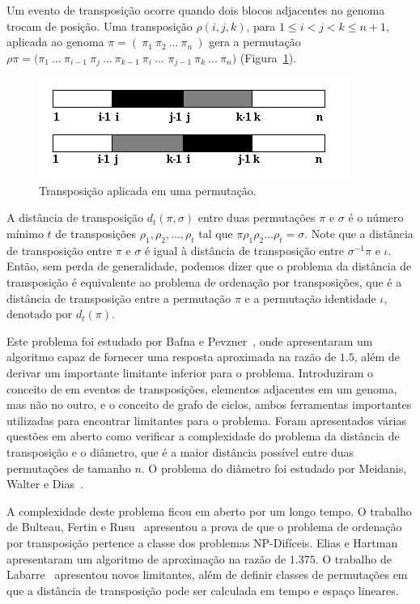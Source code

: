Um evento de transposição ocorre quando dois blocos adjacentes no
genoma trocam de posição. Uma transposição $\rho(i, j, k)$, para
$1 \leq i < j < k \leq n + 1$, aplicada ao genoma $\pi =
(~\pi_{1}~\pi_{2}~\ldots~\pi_{n}~)$ gera a permutação $\rho\pi =
(\pi_{1}~\ldots~\pi_{i-1}~\pi_{j}~\ldots~\pi_{k-1}~\pi_{i}~\ldots$
$\pi_{j-1}~\pi_{k}~\ldots~\pi_{n})$ (Figura~\ref{fig:transposition}).

\begin{figure}[h]
  \centering
  \includegraphics{images/transposition.png} 
  \caption{Transposição aplicada em uma permutação.}
  \label{fig:transposition}
\end{figure}

A distância de transposição $d_{t}(\pi, \sigma)$ entre duas
permutações $\pi$ e $\sigma$ é o número mínimo $t$ de transposições
$\rho_{1}, \rho_{2}, \ldots, \rho_{t}$ tal que
$\pi \rho_{1} \rho_{2} \ldots \rho_{t} = \sigma$. Note que a distância
de transposição entre $\pi$ e $\sigma$ é igual à distância de transposição
entre $\sigma^{-1} \pi$ e $\iota$. Então, sem perda de generalidade,
podemos dizer que o problema da distância de transposição é
equivalente ao problema de ordenação por transposições, que é a
distância de transposição entre a permutação $\pi$ e a permutação
identidade $\iota$, denotado por $d_{t}(\pi)$.

Este problema foi estudado por Bafna e
Pevzner~\cite{BafnaPevzner*1998}, onde apresentaram um algoritmo capaz
de fornecer uma resposta aproximada na razão de $1.5$, além de derivar
um importante limitante inferior para o problema. Introduziram o
conceito de \bkp{} em eventos de transposições, elementos adjacentes
em um genoma, mas não no outro, e o conceito de grafo de ciclos, ambos
ferramentas importantes utilizadas para encontrar limitantes para o
problema. Foram apresentados várias questões em aberto como verificar
a complexidade do problema da distância de transposição e o diâmetro,
que é a maior distância possível entre duas permutações de tamanho
$n$. O problema do diâmetro foi estudado por Meidanis, Walter e
Dias~\cite{MeidanisWalterDias*1997}.

A complexidade deste problema ficou em aberto por um longo tempo. O
trabalho de Bulteau, Fertin e Rusu~\cite{BulteauFertinRusu*2010}
apresentou a prova de que o problema de ordenação por transposição
pertence a classe dos problemas NP-Difíceis. Elias e
Hartman~\cite{EliasHartman*2006} apresentaram um algoritmo de
aproximação na razão de $1.375$. O trabalho de
Labarre~\cite{Labarre*2006} apresentou novos limitantes, além de
definir classes de permutações em que a distância de transposição pode
ser calculada em tempo e espaço lineares.

